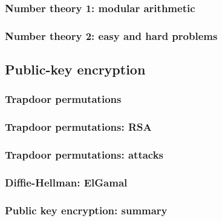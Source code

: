 \documentclass[10pt,a4paper]{report}
\begin{document}
\section{Number theory 1: modular arithmetic}
\section{Number theory 2: easy and hard problems}

\chapter{Public-key encryption}

\section{Trapdoor permutations}
\section{Trapdoor permutations: RSA}
\section{Trapdoor permutations: attacks}
\section{Diffie-Hellman: ElGamal}
\section{Public key encryption: summary}

\part{}
\end{document}
